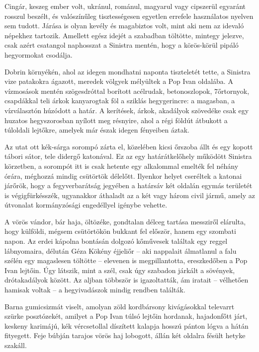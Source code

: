 \documentclass{IEEEtran}
\begin{document}
Cingár, keszeg ember volt, ukránul, románul, magyarul vagy cipszerül egyaránt
rosszul beszélt, és valószínűleg tisztességesen egyetlen errefele használatos
nyelven sem tudott. Járása is olyan kevély és magabiztos volt, mint aki nem az
idevaló népekhez tartozik. Amellett egész idejét a szabadban töltötte, mintegy
jelezve, csak azért csatangol naphosszat a Sinistra mentén, hogy a körös-körül
pipáló hegyormokat csodálja.

Dobrin környékén, ahol az idegen mondhatni naponta tiszteletét tette, a
Sinistra vize patakokra ágazott, meredek völgyek mélyültek a Pop Ivan
oldalába. A vízmosások mentén szögesdróttal borított acélrudak, betonoszlopok,
7őrtornyok, csapdákkal teli árkok kanyarogtak föl a sziklás hegygerincre: a
magasban, a vízválasztón húzódott a határ. A kerítések, árkok, akadályok
szövedéke csak egy huzatos hegyszorosban nyílott meg résnyire, ahol a régi
földút átbukott a túloldali lejtőkre, amelyek már észak idegen fényeiben
áztak.

Az utat ott kék-sárga sorompó zárta el, közelében kicsi őrszoba állt és egy
kopott tábori sátor, tele didergő katonával. Ez az egy határátkelőhely
működött Sinistra körzetben, a sorompót itt is csak hetente egy alkalommal
emelték fel néhány órára, méghozzá mindig csütörtök délelőtt. Ilyenkor helyet
cseréltek a katonai járőrök, hogy a fegyverbarátság jegyében a határsáv két
oldalán egymás területét is végigfürkésszék, ugyanakkor áthaladt az a két vagy
három civil jármű, amely az útvonalat kormányzósági engedéllyel igénybe
vehette.

A vörös vándor, bár haja, öltözéke, gondtalan délceg tartása messziről
elárulta, hogy külföldi, mégsem csütörtökön bukkant fel először, hanem egy
szombati napon. Az erdei kápolna bontásán dolgozó kőművesek találtak egy
reggel lábnyomaira, délután Géza Kökény éjjeliőr – aki nappalait álmatlanul a
falu szélén egy magaslesen töltötte – elevenen is megpillantotta, ereszkedőben
a Pop Ivan lejtőin. Úgy látszik, mint a szél, csak úgy szabadon járkált a
sövények, drótakadályok között. Az aljban többször is igazoltatták, ám iratait
– vélhetően hamisak voltak – a hegyivadászok mindig rendben találták.

Barna gumicsizmát viselt, amolyan zöld kordbársony kivágásokkal televarrt
szürke posztózekét, amilyet a Pop Ivan túlsó lejtőin hordanak, hajadonfőtt
járt, keskeny karimájú, kék vércsetollal díszített kalapja hosszú pánton lógva
a hátán fityegett. Feje búbján tarajos vörös haj lobogott, állán két oldalra
fésült hetyke szakáll.
\end{document}
